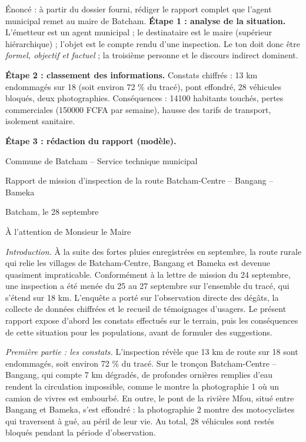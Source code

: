 \documentclass[11pt]{article}
\begin{document}
\begin{exoresolu}
Énoncé : à partir du dossier fourni, rédiger le rapport complet que l'agent municipal remet au maire de Batcham.
\tcblower
\textbf{Étape 1 : analyse de la situation.} L'émetteur est un agent municipal ; le destinataire est le maire (supérieur hiérarchique) ; l'objet est le compte rendu d'une inspection. Le ton doit donc être \emph{formel, objectif et factuel} ; la troisième personne et le discours indirect dominent.

\textbf{Étape 2 : classement des informations.} Constats chiffrés : 13 km endommagés sur 18 (soit environ 72 \% du tracé), pont effondré, 28 véhicules bloqués, deux photographies. Conséquences : \num{14100} habitants touchés, pertes commerciales (\num{150000} FCFA par semaine), hausse des tarifs de transport, isolement sanitaire.

\textbf{Étape 3 : rédaction du rapport (modèle).}

Commune de Batcham -- Service technique municipal\par
Rapport de mission d'inspection de la route Batcham-Centre -- Bangang -- Bameka\par
Batcham, le 28 septembre\par
À l'attention de Monsieur le Maire\par

\emph{Introduction.} À la suite des fortes pluies enregistrées en septembre, la route rurale qui relie les villages de Batcham-Centre, Bangang et Bameka est devenue quasiment impraticable. Conformément à la lettre de mission du 24 septembre, une inspection a été menée du 25 au 27 septembre sur l'ensemble du tracé, qui s'étend sur 18 km. L'enquête a porté sur l'observation directe des dégâts, la collecte de données chiffrées et le recueil de témoignages d'usagers. Le présent rapport expose d'abord les constats effectués sur le terrain, puis les conséquences de cette situation pour les populations, avant de formuler des suggestions.

\emph{Première partie : les constats.} L'inspection révèle que 13 km de route sur 18 sont endommagés, soit environ 72 \% du tracé. Sur le tronçon Batcham-Centre -- Bangang, qui compte 7 km dégradés, de profondes ornières remplies d'eau rendent la circulation impossible, comme le montre la photographie 1 où un camion de vivres est embourbé. En outre, le pont de la rivière Mfou, situé entre Bangang et Bameka, s'est effondré : la photographie 2 montre des motocyclistes qui traversent à gué, au péril de leur vie. Au total, 28 véhicules sont restés bloqués pendant la période d'observation.


\end{exoresolu}
\end{document}
